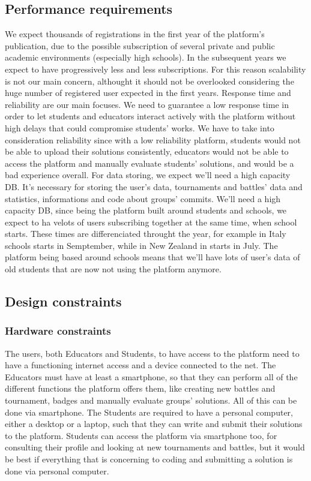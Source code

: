 \documentclass{article}
\begin{document}
{\subsection{Performance requirements}
We expect thousands of registrations in the first year of the platform's publication, due to the possible
subscription of several private and public academic environments (especially high schools).
In the subsequent years we expect to have progressively less and less subscriptions. For this reason scalability
is not our main concern, althought it should not be overlooked considering the huge number of registered
user expected in the first years. Response time and reliability are our main focuses.
We need to guarantee a low response time in order to let students and educators interact actively with the platform
without high delays that could compromise students' works.
We have to take into consideration reliability since with a low reliability platform, students would not be able to upload their solutions consistently,
educators would not be able to access the platform and manually evaluate students' solutions, and would be a bad experience overall.
For data storing, we expect we'll need a high capacity DB. It's necessary for storing
the user's data, tournaments and battles' data and statistics, informations and code about groups' commits.
We'll need a high capacity DB, since being the platform built around students and schools, we expect to ha velots of users subscribing together
at the same time, when school starts. These times are differenciated throught the year, for example in Italy schools starts in Semptember, while in
New Zealand in starts in July. The platform being based around schools means that we'll have  lots of user's data of old students that are now not using
the platform anymore.
\subsection{Design constraints}
\subsubsection{Hardware constraints}
The users, both Educators and Students, to have access to the platform need to have a functioning internet access and a device connected to the net.
The Educators must have at least a smartphone, so that they can perform all of the different functions the platform offers them, like creating new battles
and tournament, badges and manually evaluate groups' solutions. All of this can be done via smartphone.
The Students are required to have a personal computer, either a desktop or a laptop, such that they can write and submit their solutions to the platform.
Students can access the platform via smartphone too, for consulting their profile and looking at new tournaments and battles, but it would be
best if everything that is concerning to coding and submitting a solution is done via personal computer.
}
\end{document}
